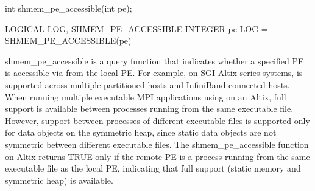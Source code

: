\synC     
int shmem_pe_accessible(int pe);

\synF
LOGICAL LOG, SHMEM_PE_ACCESSIBLE
INTEGER pe
LOG = SHMEM_PE_ACCESSIBLE(pe)

{
       shmem\_pe\_accessible is  a  query function  that indicates  whether  a
       specified PE is accessible via \openshmem from the local PE. For example, on  SGI	Altix  series  systems, \openshmem	is  supported  across multiple
       partitioned hosts and InfiniBand connected hosts. When running multiple executable MPI applications using \openshmem on an Altix,
       full \openshmem support is available between processes running from the same
       executable file. However, \openshmem support between processes of different
       executable  files  is  supported only for data objects on the symmetric
       heap, since static data objects are  not symmetric  between  different
       executable  files. The shmem\_pe\_accessible function on Altix returns
       TRUE only if  the  remote  PE  is  a  process  running  from  the  same
       executable  file	 as  the  local PE, indicating that full \openshmem support
       (static memory and symmetric heap) is available.
}
{

\notesB{}
}

\eAPI